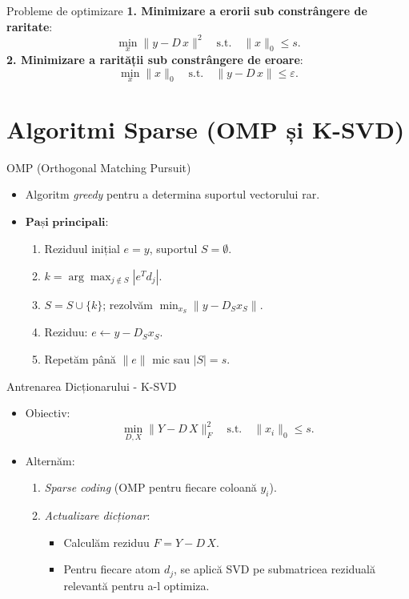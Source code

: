 \documentclass[aspectratio=169,xcolor=dvipsnames]{beamer}
\begin{document}
\begin{frame}{Probleme de optimizare}
  \textbf{1. Minimizare a erorii sub constrângere de raritate}:
  \[
    \min_{x} \|y - D\,x\|^2 
    \quad \text{s.t.} \quad 
    \|x\|_0 \le s.
  \]
  \textbf{2. Minimizare a rarității sub constrângere de eroare}:
  \[
    \min_{x} \|x\|_0
    \quad \text{s.t.} \quad
    \|y - D\,x\| \le \varepsilon.
  \]
\end{frame}

\section{Algoritmi Sparse (OMP și K-SVD)}

\begin{frame}{OMP (Orthogonal Matching Pursuit)}
  \begin{itemize}
    \item Algoritm \emph{greedy} pentru a determina suportul vectorului rar.
    \item \(\textbf{Pași principali}:\)
    \begin{enumerate}
      \item Reziduul inițial \(e = y\), suportul \(S = \emptyset\).
      \item \(\displaystyle k = \arg \max_{j \notin S} |e^T d_j|\).
      \item \(S = S \cup \{k\}\); rezolvăm \(\min_{x_S} \| y - D_S x_S \|\).
      \item Reziduu: \( e \leftarrow y - D_S x_S\).
      \item Repetăm până \(\|e\|\) mic sau \(|S| = s\).
    \end{enumerate}
  \end{itemize}
\end{frame}

\begin{frame}{Antrenarea Dicționarului - K-SVD}
  \begin{itemize}
    \item Obiectiv: 
    \[
      \min_{D, X} \|Y - D\,X\|_F^2
      \quad\text{s.t.}\quad
      \|x_i\|_0 \le s.
    \]
    \item Alternăm:
    \begin{enumerate}
      \item \emph{Sparse coding} (OMP pentru fiecare coloană \(y_i\)).
      \item \emph{Actualizare dicționar}:
        \begin{itemize}
          \item Calculăm reziduu \(F = Y - D\,X\).
          \item Pentru fiecare atom \(d_j\), se aplică SVD pe submatricea reziduală relevantă pentru a-l optimiza.
        \end{itemize}
    \end{enumerate}
  \end{itemize}
\end{frame}
\end{document}
